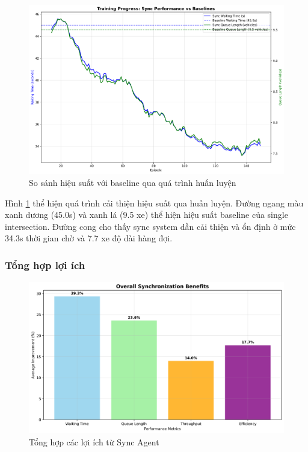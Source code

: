 \begin{figure}[!htp]
    \centering
    \includegraphics[width=\textwidth]{figures/training_with_baselines.png}
    \caption{So sánh hiệu suất với baseline qua quá trình huấn luyện}
    \label{fig:training_with_baselines}
\end{figure}

Hình \ref{fig:training_with_baselines} thể hiện quá trình cải thiện hiệu suất qua huấn luyện. Đường ngang màu xanh dương (45.0s) và xanh lá (9.5 xe) thể hiện hiệu suất baseline của single intersection. Đường cong cho thấy sync system dần cải thiện và ổn định ở mức 34.3s thời gian chờ và 7.7 xe độ dài hàng đợi.

\subsubsection{Tổng hợp lợi ích}

\begin{figure}[!htp]
    \centering
    \includegraphics[width=\textwidth]{figures/overall_benefits.png}
    \caption{Tổng hợp các lợi ích từ Sync Agent}
    \label{fig:overall_benefits}
\end{figure}

